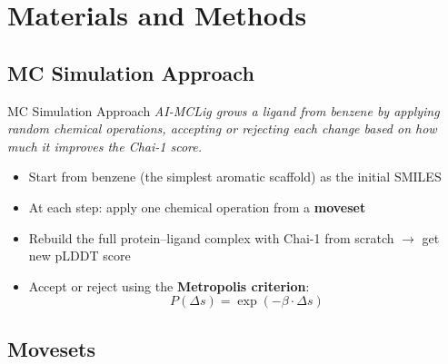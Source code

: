 \documentclass{beamer}
\begin{document}
\section{Materials and Methods}

\subsection{MC Simulation Approach}

\begin{frame}{MC Simulation Approach}
  \textit{AI-MCLig grows a ligand from benzene by applying random chemical operations, accepting or rejecting each change based on how much it improves the Chai-1 score.}

  \vspace{0.8em}
  \begin{itemize}
    \item Start from benzene (the simplest aromatic scaffold) as the initial SMILES
    \item At each step: apply one chemical operation from a \textbf{moveset}
    \item Rebuild the full protein--ligand complex with Chai-1 from scratch $\rightarrow$ get new pLDDT score
    \item Accept or reject using the \textbf{Metropolis criterion}:
      \[
        P(\Delta s) = \exp(-\beta \cdot \Delta s)
      \]
  \end{itemize}
\end{frame}

\subsection{Movesets}
\end{document}
